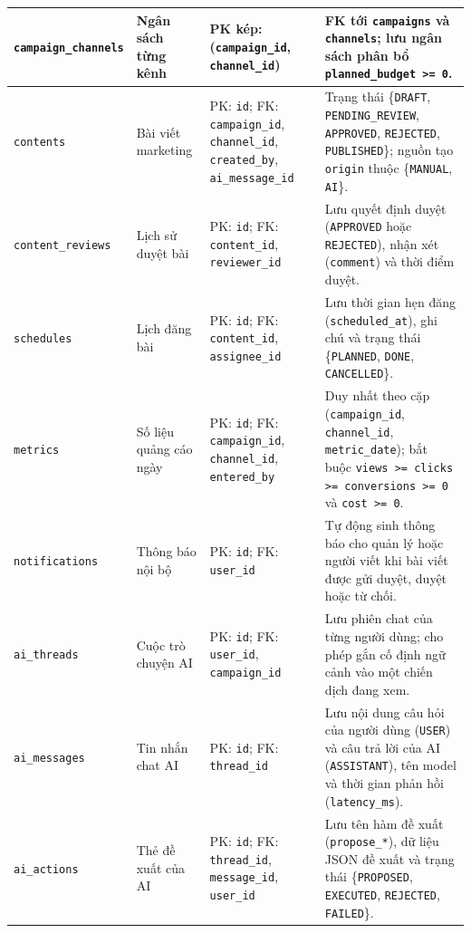 \begin{small}
\begin{longtable}{|L{3.1cm}|L{2.3cm}|L{2.8cm}|L{5.5cm}|}
\hline
\texttt{campaign\_channels} & Ngân sách từng kênh & PK kép: (\texttt{campaign\_id}, \texttt{channel\_id}) & FK tới \texttt{campaigns} và \texttt{channels}; lưu ngân sách phân bổ \texttt{planned\_budget >= 0}.\\
\hline
\texttt{contents} & Bài viết marketing & PK: \texttt{id}; FK: \texttt{campaign\_id}, \texttt{channel\_id}, \texttt{created\_by}, \texttt{ai\_message\_id} & Trạng thái \{\texttt{DRAFT}, \texttt{PENDING\_REVIEW}, \texttt{APPROVED}, \texttt{REJECTED}, \texttt{PUBLISHED}\}; nguồn tạo \texttt{origin} thuộc \{\texttt{MANUAL}, \texttt{AI}\}.\\
\hline
\texttt{content\_reviews} & Lịch sử duyệt bài & PK: \texttt{id}; FK: \texttt{content\_id}, \texttt{reviewer\_id} & Lưu quyết định duyệt (\texttt{APPROVED} hoặc \texttt{REJECTED}), nhận xét (\texttt{comment}) và thời điểm duyệt.\\
\hline
\texttt{schedules} & Lịch đăng bài & PK: \texttt{id}; FK: \texttt{content\_id}, \texttt{assignee\_id} & Lưu thời gian hẹn đăng (\texttt{scheduled\_at}), ghi chú và trạng thái \{\texttt{PLANNED}, \texttt{DONE}, \texttt{CANCELLED}\}.\\
\hline
\texttt{metrics} & Số liệu quảng cáo ngày & PK: \texttt{id}; FK: \texttt{campaign\_id}, \texttt{channel\_id}, \texttt{entered\_by} & Duy nhất theo cặp (\texttt{campaign\_id}, \texttt{channel\_id}, \texttt{metric\_date}); bắt buộc \texttt{views >= clicks >= conversions >= 0} và \texttt{cost >= 0}.\\
\hline
\texttt{notifications} & Thông báo nội bộ & PK: \texttt{id}; FK: \texttt{user\_id} & Tự động sinh thông báo cho quản lý hoặc người viết khi bài viết được gửi duyệt, duyệt hoặc từ chối.\\
\hline
\texttt{ai\_threads} & Cuộc trò chuyện AI & PK: \texttt{id}; FK: \texttt{user\_id}, \texttt{campaign\_id} & Lưu phiên chat của từng người dùng; cho phép gắn cố định ngữ cảnh vào một chiến dịch đang xem.\\
\hline
\texttt{ai\_messages} & Tin nhắn chat AI & PK: \texttt{id}; FK: \texttt{thread\_id} & Lưu nội dung câu hỏi của người dùng (\texttt{USER}) và câu trả lời của AI (\texttt{ASSISTANT}), tên model và thời gian phản hồi (\texttt{latency\_ms}).\\
\hline
\texttt{ai\_actions} & Thẻ đề xuất của AI & PK: \texttt{id}; FK: \texttt{thread\_id}, \texttt{message\_id}, \texttt{user\_id} & Lưu tên hàm đề xuất (\texttt{propose\_*}), dữ liệu JSON đề xuất và trạng thái \{\texttt{PROPOSED}, \texttt{EXECUTED}, \texttt{REJECTED}, \texttt{FAILED}\}.\\
\hline
\end{longtable}
\end{small}

